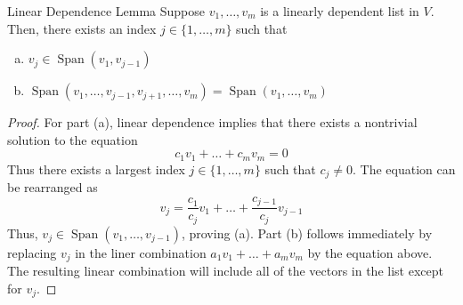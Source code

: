\documentclass{book}
\theoremstyle{definition}
\DeclareMathOperator{\linspan}{Span}
\begin{document}
\begin{thm}{Linear Dependence Lemma}
    Suppose $v_1,\dots,v_m$ is a linearly dependent list in $V$. Then, there
    exists an index $j \in \{1,\dots,m\}$ such that
    \begin{enumerate}[(a)]
        \item $v_j \in \linspan(v_1,v_{j-1})$
        \item $\linspan(v_1,\dots,v_{j-1},v_{j+1},\dots,v_m) =
            \linspan(v_1,\dots,v_m)$
    \end{enumerate}
\end{thm}

\begin{proof}
    For part (a), linear dependence implies that there exists a nontrivial
    solution to the equation
    \[
        c_1v_1+\dots+c_mv_m = 0
    \]
    Thus there exists a largest index $j \in \{1,\dots,m\}$ such that
    $c_j \neq 0$. The equation can be rearranged as
    \[
        v_j = \frac{c_1}{c_j} v_1 + \dots + \frac{c_{j-1}}{c_j} v_{j-1}
    \]
    Thus, $v_j \in \linspan(v_1,\dots,v_{j-1})$, proving (a). Part (b) follows
    immediately by replacing $v_j$ in the liner combination $a_1v_1 + \dots +
    a_mv_m$ by the equation above. The resulting linear combination will include
    all of the vectors in the list except for $v_j$.
\end{proof}
\end{document}
